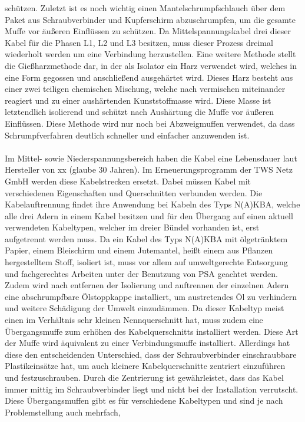 schützen. Zuletzt ist es noch wichtig einen Mantelschrumpfschlauch über dem Paket aus Schraubverbinder und Kupferschirm abzuschrumpfen, um die gesamte Muffe 
vor äußeren Einflüssen zu schützen. Da Mittelspannungskabel drei dieser Kabel für die Phasen L1, L2 und L3 besitzen, muss dieser Prozess dreimal wiederholt 
werden um eine Verbindung herzustellen. Eine weitere Methode stellt die Gießharzmethode dar, in der als Isolator ein Harz verwendet wird, welches in eine Form 
gegossen und anschließend ausgehärtet wird. Dieses Harz besteht aus einer zwei teiligen chemischen Mischung, welche nach vermischen miteinander reagiert und 
zu einer aushärtenden Kunststoffmasse wird. Diese Masse ist letztendlich isolierend und schützt nach Aushärtung die Muffe vor äußeren Einflüssen. Diese Methode 
wird nur noch bei Abzweigmuffen verwendet, da dass Schrumpfverfahren deutlich schneller und einfacher anzuwenden ist.
\\\\
Im Mittel- sowie Niederspannungsbereich haben die Kabel eine Lebensdauer laut Hersteller von xx (glaube 30 Jahren). Im Erneuerungsprogramm der TWS Netz GmbH 
werden diese Kabelstrecken ersetzt. Dabei müssen Kabel mit verschiedenen Eigenschaften und Querschnitten verbunden werden. 
Die Kabelauftrennung findet ihre Anwendung bei Kabeln des Typs N(A)KBA, welche alle drei Adern in einem Kabel besitzen und für den Übergang auf einen aktuell 
verwendeten Kabeltypen, welcher im dreier Bündel vorhanden ist, erst aufgetrennt werden muss. Da ein Kabel des Typs N(A)KBA mit ölgetränktem Papier, einem 
Bleischirm und einem Jutemantel, heißt einem aus Pflanzen hergestelltem Stoff, isoliert ist, muss vor allem auf umweltgerechte Entsorgung und fachgerechtes 
Arbeiten unter der Benutzung von PSA geachtet werden. Zudem wird nach entfernen der Isolierung und auftrennen der einzelnen Adern eine abschrumpfbare 
Ölstoppkappe installiert, um austretendes Öl zu verhindern und weitere Schädigung der Umwelt einzudämmen. Da dieser Kabeltyp meist einen im Verhältnis sehr 
kleinen Nennquerschnitt hat, muss zudem eine Übergangsmuffe zum erhöhen des Kabelquerschnitts installiert werden. Diese Art der Muffe wird äquivalent zu 
einer Verbindungsmuffe installiert. Allerdings hat diese den entscheidenden Unterschied, dass der Schraubverbinder einschraubbare Plastikeinsätze hat, um auch 
kleinere Kabelquerschnitte zentriert einzuführen und festzuschrauben. Durch die Zentrierung ist gewährleistet, dass das Kabel immer mittig im Schraubverbinder 
liegt und nicht bei der Installation verrutscht. Diese Übergangsmuffen gibt es für verschiedene Kabeltypen und sind je nach Problemstellung auch mehrfach, \zB 
